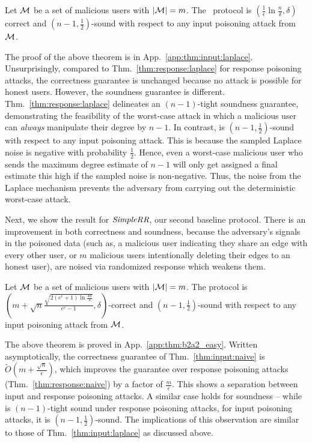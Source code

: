  \begin{thm} Let $\mathcal{M}$ be a set of malicious users with $|\mathcal{M}| = m$. The \RLap~protocol is $(\frac{1}{\epsilon}\ln\frac{n}{\delta},\delta)$ correct and $(n-1,\frac{1}{2})$-sound with respect to any input poisoning attack from $\mathcal{M}$. \label{thm:input:laplace}\end{thm}
The proof of the above theorem is in App.~\ref{app:thm:input:laplace}.
Unsurprisingly, compared to Thm.~\ref{thm:response:laplace} for response poisoning attacks, the correctness guarantee is unchanged because no attack is possible for honest users. However, the soundness guarantee is different. Thm.~\ref{thm:response:laplace} delineates an $(n-1)$-tight soundness guarantee, demonstrating the feasibility of the worst-case attack in which a malicious user can \textit{always} manipulate their degree by $n-1$. In contrast, \RLap{} is $(n-1, \frac{1}{2})$-sound with respect to any input poisoning attack. This is because the sampled Laplace noise is negative with probability $\frac{1}{2}$.  Hence, even a worst-case malicious user who sends the maximum degree estimate of $n-1$ will only get assigned a final estimate this high if the sampled noise is non-negative. Thus, the noise from the Laplace mechanism prevents the adversary from carrying out the deterministic worst-case attack.

Next, we show the result for $\textit{SimpleRR}{}$, our second baseline protocol. There is an improvement in both correctness and soundness, because the adversary's signals in the poisoned data (such as, a malicious user indicating they share an edge with every other user, or $m$ malicious users intentionally deleting their edges to an honest user), are noised via randomized response which weakens them.

\begin{thm}\label{thm:b2a2_easy}  Let $\mathcal{M}$ be a set of malicious users with $|\mathcal{M}| = m$. The \DegRRNaive{} protocol is $(m+\sqrt{n}\frac{\sqrt{2(e^\epsilon+1) \ln \frac{4n}{\delta}}}{e^\epsilon-1},\delta)$-correct and $(n-1,\frac{1}{2})$-sound with respect to any input poisoning attack from $\mathcal{M}$.\label{thm:input:naive}
\end{thm}
The above theorem is proved in App.~\ref{app:thm:b2a2_easy}.
Written asymptotically, the correctness guarantee of Thm.~\ref{thm:input:naive} is $\tilde{O}(m + \frac{\sqrt{n}}{\epsilon})$, which improves the guarantee over response poisoning attacks (Thm.~\ref{thm:response:naive}) by a factor of $\frac{m}{\epsilon}$. This shows  a separation between input and response poisoning attacks.  A similar case holds for soundness -- while \DegRRNaive{} is $(n-1)$-tight sound under response poisoning attacks, for input poisoning attacks, it is $(n-1, \frac{1}{2})$-sound. The implications of this observation are similar to those of Thm.~\ref{thm:input:laplace} as discussed above.


